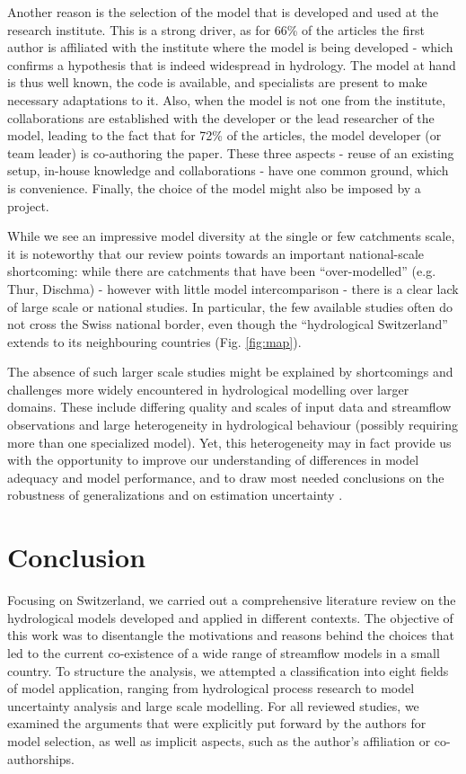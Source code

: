 \documentclass[10pt,a4paper]{article}
\begin{document}
Another reason is the selection of the model that is developed and used
at the research institute. This is a strong driver, as for 66\% of the
articles the first author is affiliated with the institute where the
model is being developed - which confirms a hypothesis that is indeed
widespread in hydrology. The model at hand is thus well known, the code
is available, and specialists are present to make necessary adaptations
to it. Also, when the model is not one from the institute,
collaborations are established with the developer or the lead researcher
of the model, leading to the fact that for 72\% of the articles, the
model developer (or team leader) is co-authoring the paper. These three
aspects - reuse of an existing setup, in-house knowledge and
collaborations - have one common ground, which is convenience. Finally,
the choice of the model might also be imposed by a project.

While we see an impressive model diversity at the single or few
catchments scale, it is noteworthy that our review points towards an
important national-scale shortcoming: while there are catchments that
have been ``over-modelled'' (e.g. Thur, Dischma) - however with little
model intercomparison - there is a clear lack of large scale or national
studies. In particular, the few available studies often do not cross the
Swiss national border, even though the ``hydrological Switzerland''
extends to its neighbouring countries
(Fig. \ref{fig:map}).

The absence of such larger scale studies might be explained by
shortcomings and challenges more widely encountered in hydrological
modelling over larger domains. These include differing quality and
scales of input data and streamflow observations and large heterogeneity
in hydrological behaviour (possibly requiring more than one specialized
model). Yet, this heterogeneity may in fact provide us with the
opportunity to improve our understanding of differences in model
adequacy and model performance, and to draw most needed conclusions on
the robustness of generalizations and on estimation
uncertainty \citep{Gupta_2014,McMillan_2016}.


\section{Conclusion}
\label{sec:conclusion}

Focusing on Switzerland, we carried out a comprehensive literature
review on the hydrological models developed and applied in different
contexts. The objective of this work was to disentangle the motivations
and reasons behind the choices that led to the current co-existence of a
wide range of streamflow models in a small country. To structure the
analysis, we attempted a classification into eight fields of model
application, ranging from hydrological process research to model
uncertainty analysis and large scale modelling. For all reviewed
studies, we examined the arguments that were explicitly put forward by
the authors for model selection, as well as implicit aspects, such as
the author's affiliation or co-authorships. 
\end{document}
